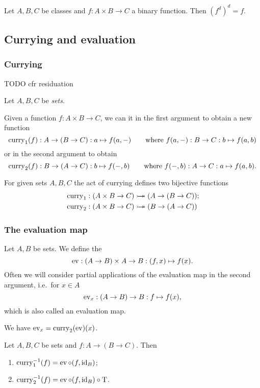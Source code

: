\begin{lemma}
Let $A, B, C$ be classes and $f: A\times B \to C$ a binary function. Then $(f^d)^d = f$.
\end{lemma}

\subsection{Currying and evaluation}
\subsubsection{Currying}
TODO cfr residuation

\begin{definition}
Let $A,B,C$ be \emph{sets}.

Given a function $f: A\times B \to C$, we can  it in the first argument to obtain a new function
\[ \operatorname{curry}_1(f): A \to (B\to C): a\mapsto f(a,-) \qquad \text{where $f(a,-): B \to C: b\mapsto f(a,b)$} \]
or in the second argument to obtain
\[ \operatorname{curry}_2(f): B \to (A\to C): b\mapsto f(-,b) \qquad \text{where $f(-,b): A \to C: a\mapsto f(a,b)$}. \]
\end{definition}
\begin{lemma}
For given sets $A,B,C$ the act of currying defines two bijective functions
\begin{align*}
&\operatorname{curry}_1: (A\times B \to C) \mathrel{\rightarrowtail\kern-1.9ex\twoheadrightarrow} (A \to (B\to C)); \\
&\operatorname{curry}_2: (A\times B \to C) \mathrel{\rightarrowtail\kern-1.9ex\twoheadrightarrow} (B \to (A\to C))
\end{align*}
\end{lemma}

\subsubsection{The evaluation map}
\begin{definition}
Let $A,B$ be sets. We define the 
\[ \operatorname{ev}: (A\to B)\times A \to B: (f,x) \mapsto f(x). \]
Often we will consider partial applications of the evaluation map in the second argument, i.e.\ for $x\in A$
\[ \operatorname{ev}_x: (A\to B) \to B: f\mapsto f(x), \]
which is also called an evaluation map.
\end{definition}
We have $\operatorname{ev}_x = \operatorname{curry}_2(\operatorname{ev})(x)$.

\begin{lemma}
Let $A,B,C$ be sets and $f: A\to (B\to C)$. Then
\begin{enumerate}
\item $\operatorname{curry}_1^{-1}(f) = \operatorname{ev}\circ (f, \operatorname{id}_B)$;
\item $\operatorname{curry}_2^{-1}(f) = \operatorname{ev}\circ (f, \operatorname{id}_B)\circ \mathrm{T}$.
\end{enumerate}
\end{lemma}

